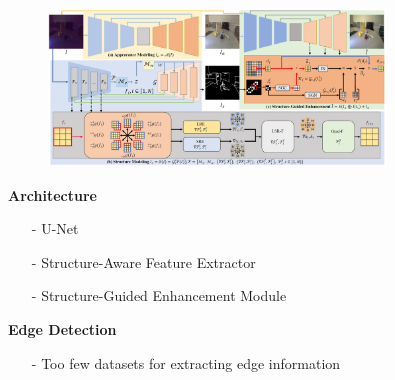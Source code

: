 \documentclass[CJK,aspectratio=169]{beamer}  %
\begin{document}
	\begin{frame}
		\begin{figure}[htbp]
			\begin{center}
				\includegraphics[width=0.8\textwidth]{picture/LLIE/Structure Modeling and Guidance/Overview}
			\end{center}
		\end{figure}
		
		\begin{minipage}{.45\textwidth}
			\textbf{\tiny Architecture}
			\begin{itemize}\tiny
			\item [-] U-Net
					
			\item [-] Structure-Aware Feature Extractor
					
			\item [-] Structure-Guided Enhancement Module
			\end{itemize}
		\end{minipage}
		\begin{minipage}{.45\textwidth}
			\textbf{\tiny Edge Detection}
			\begin{itemize}\tiny
			\item [-] Too few datasets for extracting edge information
			

\end{itemize}
\end{minipage}
\end{frame}
\end{document}
